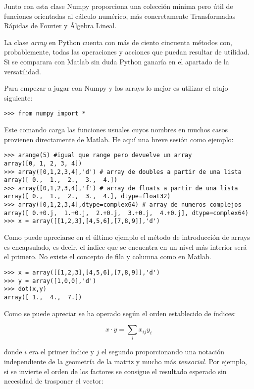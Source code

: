 \documentclass[a4paper,10pt]{article}
\begin{document}
Junto con esta clase Numpy proporciona una colección mínima pero útil
de funciones orientadas al cálculo numérico, más concretamente
Transformadas Rápidas de Fourier y Álgebra Lineal.

La clase \emph{array} en Python cuenta con más de ciento cincuenta
métodos con, probablemente, todas las operaciones y acciones que
puedan resultar de utilidad. Si se comparara con Matlab sin duda
Python ganaría en el apartado de la versatilidad.

Para empezar a jugar con Numpy y los arrays lo mejor es utilizar el
atajo siguiente:

\begin{lstlisting}
>>> from numpy import *
\end{lstlisting}

Este comando carga las funciones usuales cuyos nombres en muchos casos
provienen directamente de Matlab.  He aquí una breve sesión como
ejemplo:

\begin{lstlisting}
>>> arange(5) #igual que range pero devuelve un array
array([0, 1, 2, 3, 4])
>>> array([0,1,2,3,4],'d') # array de doubles a partir de una lista
array([ 0.,  1.,  2.,  3.,  4.])
>>> array([0,1,2,3,4],'f') # array de floats a partir de una lista
array([ 0.,  1.,  2.,  3.,  4.], dtype=float32)
>>> array([0,1,2,3,4],dtype=complex64) # array de numeros complejos
array([ 0.+0.j,  1.+0.j,  2.+0.j,  3.+0.j,  4.+0.j], dtype=complex64)
>>> x = array([[1,2,3],[4,5,6],[7,8,9]],'d') 
\end{lstlisting}

Como puede apreciarse en el último ejemplo el método de introducción
de arrays es encapsulado, es decir, el índice que se encuentra en un
nivel más interior será el primero.  No existe el concepto de fila y
columna como en Matlab. 

\begin{lstlisting}
>>> x = array([[1,2,3],[4,5,6],[7,8,9]],'d')
>>> y = array([1,0,0],'d')
>>> dot(x,y)
array([ 1.,  4.,  7.])
\end{lstlisting}

Como se puede apreciar se ha operado según el orden establecido de
índices:

\[x \cdot y = \sum_i x_{ij}y_i  \]

donde $i$ era el primer índice y $j$ el segundo proporcionando una
notación independiente de la geometría de la matriz y mucho más
\emph{tensorial}.  Por ejemplo, si se invierte el orden de los
factores se consigue el resultado esperado sin necesidad de trasponer
el vector:
\end{document}

